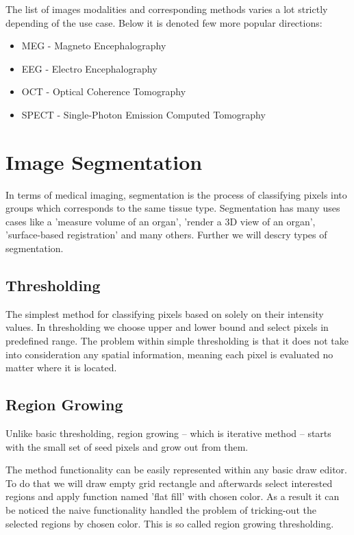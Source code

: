 The list of images modalities and corresponding methods varies a lot strictly depending of the use case.
Below it is denoted few more popular directions:
\begin{itemize}
    \item MEG - Magneto Encephalography
    \item EEG -  Electro Encephalography
    \item OCT -  Optical Coherence Tomography
    \item SPECT -  Single-Photon Emission Computed Tomography
\end{itemize}

\section{Image Segmentation}
In terms of medical imaging, segmentation is the process of classifying pixels into groups which corresponds to the same tissue type. Segmentation has many uses cases like a 'measure volume of an organ', 'render a 3D view of an organ', 'surface-based registration' and many others. Further we will descry types of segmentation. 

\subsection{Thresholding}
The simplest method for classifying pixels based on solely on their intensity values. In thresholding we choose upper and lower bound and select pixels in predefined range.
The problem within simple thresholding is that it does not take into consideration any spatial information, meaning each pixel is evaluated no matter where it is located.    

\subsection{Region Growing}
Unlike basic thresholding, region growing -- which is iterative method -- starts with the small set of seed pixels and grow out from them.

The method functionality can be easily represented within any basic draw editor. To do that we will draw empty grid rectangle and afterwards select interested regions and apply function named 'flat fill' with chosen color. As a result it can be noticed the naive functionality handled the problem of tricking-out the selected regions by chosen color. This is so called region growing thresholding.    

